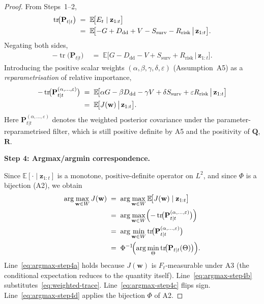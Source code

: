 \documentclass[12pt,openany]{book}
\numberwithin{equation}{chapter}
\theoremstyle{plain}
\theoremstyle{definition}
\theoremstyle{remark}
\DeclareMathOperator{\tr}{tr}
\def\mathcal#1{#1}%
\begin{document}
\begin{proof}
From Steps~1--2,
\begin{align}
  \tr\!\bigl(\mathbf{P}_{t|t}\bigr)
  &\;=\;
  \mathbb{E}\!\bigl[\mathcal{E}_t \mid \mathbf{z}_{1:t}\bigr]
  \notag\\
  &\;=\;
  \mathbb{E}\!\bigl[
    -G + D_{\mathrm{dd}} + V - S_{\mathrm{surv}} - R_{\mathrm{risk}}
    \,\big|\, \mathbf{z}_{1:t}
  \bigr].
  \label{eq:trace-shortfall}
\end{align}
Negating both sides,
\begin{align}
  -\tr\!\bigl(\mathbf{P}_{t|t}\bigr)
  &\;=\;
  \mathbb{E}\!\bigl[
    G - D_{\mathrm{dd}} - V + S_{\mathrm{surv}} + R_{\mathrm{risk}}
    \,\big|\, \mathbf{z}_{1:t}
  \bigr].
  \label{eq:neg-trace-shortfall}
\end{align}
Introducing the positive scalar weights
$(\alpha,\beta,\gamma,\delta,\varepsilon)$ (Assumption~A5)
as a \emph{reparametrisation} of relative importance,
\begin{align}
  -\tr\!\bigl(\mathbf{P}_{t|t}^{(\alpha,\dots,\varepsilon)}\bigr)
  &\;=\;
  \mathbb{E}\!\bigl[
    \alpha G
    - \beta D_{\mathrm{dd}}
    - \gamma V
    + \delta S_{\mathrm{surv}}
    + \varepsilon R_{\mathrm{risk}}
    \,\big|\, \mathbf{z}_{1:t}
  \bigr]
  \notag\\
  &\;=\;
  \mathbb{E}\!\bigl[
    J(\mathbf{w}) \,\big|\, \mathbf{z}_{1:t}
  \bigr].
  \label{eq:weighted-trace}
\end{align}
Here
$\mathbf{P}_{t|t}^{(\alpha,\dots,\varepsilon)}$
denotes the weighted posterior covariance under the
parameter-reparametrised filter, which is still positive
definite by A5 and the positivity of $\mathbf{Q}$, $\mathbf{R}$.

\medskip
\noindent\textbf{Step 4: Argmax/argmin correspondence.}

Since $\mathbb{E}[\cdot\mid\mathbf{z}_{1:t}]$ is a monotone,
positive-definite operator on $L^2$, and since $\Phi$ is a bijection
(A2), we obtain
\begin{align}
  \arg\max_{\mathbf{w}\in\mathcal{W}} J(\mathbf{w})
  &\;=\;
  \arg\max_{\mathbf{w}\in\mathcal{W}}
    \mathbb{E}\!\bigl[J(\mathbf{w})\mid\mathbf{z}_{1:t}\bigr]
  \label{eq:argmax-step4a}\\
  &\;=\;
  \arg\max_{\mathbf{w}\in\mathcal{W}}
    \Bigl(
      -\tr\!\bigl(\mathbf{P}_{t|t}^{(\alpha,\dots,\varepsilon)}\bigr)
    \Bigr)
  \label{eq:argmax-step4b}\\
  &\;=\;
  \arg\min_{\mathbf{w}\in\mathcal{W}}
    \tr\!\bigl(\mathbf{P}_{t|t}^{(\alpha,\dots,\varepsilon)}\bigr)
  \label{eq:argmax-step4c}\\
  &\;=\;
  \Phi^{-1}\!\Bigl(
    \arg\min_{\Theta}
      \tr\!\bigl(\mathbf{P}_{t|t}(\Theta)\bigr)
  \Bigr).
  \label{eq:argmax-step4d}
\end{align}
Line~\eqref{eq:argmax-step4a} holds because $J(\mathbf{w})$
is $\mathcal{F}_t$-measurable under A3 (the conditional
expectation reduces to the quantity itself).
Line~\eqref{eq:argmax-step4b} substitutes~\eqref{eq:weighted-trace}.
Line~\eqref{eq:argmax-step4c} flips sign.
Line~\eqref{eq:argmax-step4d} applies the bijection $\Phi$ of A2.


\end{proof}
\end{document}
